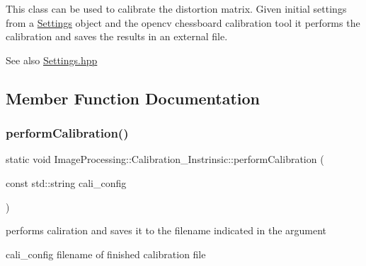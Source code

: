 This class can be used to calibrate the distortion matrix. Given initial settings from a \mbox{\hyperlink{class_settings}{Settings}} object and the opencv chessboard calibration tool it performs the calibration and saves the results in an external file.

\begin{DoxySeeAlso}{See also}
\mbox{\hyperlink{_settings_8hpp_source}{Settings.\+hpp}} 
\end{DoxySeeAlso}


\subsection{Member Function Documentation}
\mbox{\label{class_image_processing_1_1_calibration___instrinsic_acbaa653aac61aa9fc42696a51267b6b8}} 
\subsubsection{\texorpdfstring{perform\+Calibration()}{performCalibration()}}
{\footnotesize\ttfamily static void Image\+Processing\+::\+Calibration\+\_\+\+Instrinsic\+::perform\+Calibration (\begin{DoxyParamCaption}\item[{const std\+::string}]{cali\+\_\+config }\end{DoxyParamCaption})\hspace{0.3cm}{\ttfamily [static]}}

performs caliration and saves it to the filename indicated in the argument \begin{DoxyItemize}
\item cali\+\_\+config filename of finished calibration file \end{DoxyItemize}
\mbox{\label{class_image_processing_1_1_calibration___instrinsic_a69ec772ab65d6fc5918a39b5e5839e2e}} 
